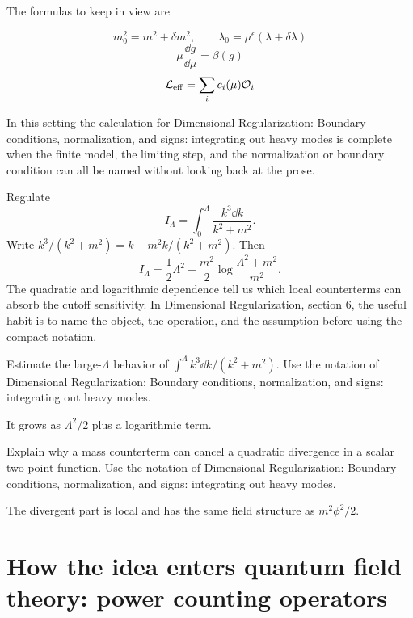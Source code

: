 The formulas to keep in view are

\[
  m_0^2=m^2+\delta m^2,\qquad \lambda_0=\mu^\epsilon(\lambda+\delta\lambda)
\]
\[
  \mu\frac{\dd g}{\dd\mu}=\beta(g)
\]
\[
  \mathcal L_{\mathrm{eff}}=\sum_i c_i(\mu)\mathcal O_i
\]

In this setting the calculation for Dimensional Regularization: Boundary conditions, normalization, and signs: integrating out heavy modes is complete when the finite model, the limiting step, and the normalization or boundary condition can all be named without looking back at the prose.




\begin{example}
Regulate
\[
  I_\Lambda=\int_0^\Lambda\frac{k^3\dd k}{k^2+m^2}.
\]
Write \(k^3/(k^2+m^2)=k-m^2k/(k^2+m^2)\).  Then
\[
  I_\Lambda=\frac12\Lambda^2-\frac{m^2}{2}\log\frac{\Lambda^2+m^2}{m^2}.
\]
The quadratic and logarithmic dependence tell us which local counterterms can absorb the cutoff sensitivity.  In Dimensional Regularization, section 6, the useful habit is to name the object, the operation, and the assumption before using the compact notation.
\end{example}



\begin{exercise}
Estimate the large-\(\Lambda\) behavior of \(\int^\Lambda k^3\dd k/(k^2+m^2)\).  Use the notation of Dimensional Regularization: Boundary conditions, normalization, and signs: integrating out heavy modes.
\begin{answer}
It grows as \(\Lambda^2/2\) plus a logarithmic term.
\end{answer}
\end{exercise}

\begin{exercise}
Explain why a mass counterterm can cancel a quadratic divergence in a scalar two-point function.  Use the notation of Dimensional Regularization: Boundary conditions, normalization, and signs: integrating out heavy modes.
\begin{answer}
The divergent part is local and has the same field structure as \(m^2\phi^2/2\).
\end{answer}
\end{exercise}



\section{How the idea enters quantum field theory: power counting operators}

